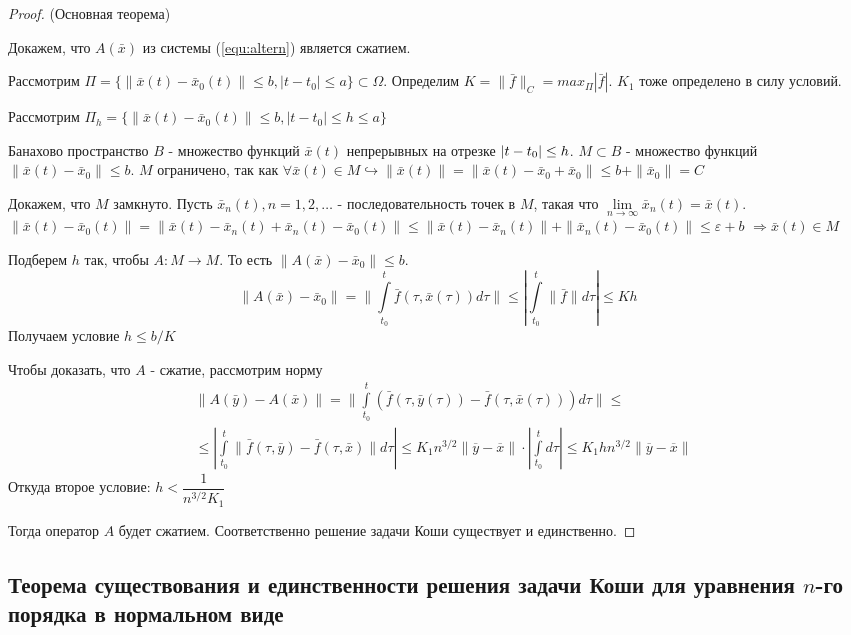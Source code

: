\begin{proof}
	(Основная теорема)
	
	Докажем, что $A(\bar{x})$ из системы (\ref{equ:altern}) является сжатием.
	
	Рассмотрим $\Pi = \{\|\bar{x}(t) - \bar{x}_0(t)\| \le b, |t-t_0| \le a   \} \subset \Omega$. Определим $K = \|\bar{f}\|_C = max_{\Pi}|\bar{f}|$. $K_1$ тоже определено в силу условий.
	
	Рассмотрим $\Pi_h = \{\|\bar{x}(t) - \bar{x}_0(t)\| \le b, |t-t_0| \le h \le a   \}$
	
	Банахово пространство $B$ - множество функций $\bar{x}(t)$ непрерывных на отрезке $|t-t_0|\hm\le h$. $M \subset B$ - множество функций $\|\bar{x}(t) - \bar{x}_0\| \le b$. $M$ ограничено, так как $\forall \bar{x}(t) \in M \hookrightarrow \|\bar{x}(t)\| = \|\bar{x}(t) - \bar{x}_0 + \bar{x}_0\| \le b + \|\bar{x}_0\| = C$
	
	Докажем, что $M$ замкнуто. Пусть $\bar{x}_n(t), n = 1, 2, \dots$ - последовательность точек в $M$, такая что $\lim\limits_{n\to \infty} \bar{x}_n(t) = \bar{x}(t)$. $\|\bar{x}(t) - \bar{x}_0(t)\| = \|\bar{x}(t) - \bar{x}_n(t) + \bar{x}_n(t) - \bar{x}_0(t)\| \le \|\bar{x}(t) - \bar{x}_n(t)\| + \|\bar{x}_n(t) - \bar{x}_0(t)\| \le \varepsilon + b$ $\Rightarrow \bar{x}(t) \in M$
	
	Подберем $h$ так, чтобы $A:M\to M$. То есть $\|A(\bar{x}) - \bar{x}_0\| \le b$.
	\[
		\|A(\bar{x}) - \bar{x}_0\| = \|\int\limits_{t_0}^t \bar{f}(\tau, \bar{x}(\tau))d\tau\| \le |\int\limits_{t_0}^t \|\bar{f}\|d\tau| \le Kh
	\]
	Получаем условие $h\le b/K$
	
	Чтобы доказать, что $A$ - сжатие, рассмотрим норму
	\begin{align*}
		&\|A(\bar{y}) - A(\bar{x})\| = \|\int\limits_{t_0}^t(\bar{f}(\tau, \bar{y}(\tau)) - \bar{f}(\tau, \bar{x}(\tau)))d\tau\|\le \\ &\le |\int\limits_{t_0}^t \|\bar{f}(\tau, \bar{y}) - \bar{f}(\tau, \bar{x})\|d\tau| \le K_1n^{3/2}\|\overline{y} - \overline{x}\|\cdot|\int\limits_{t_0}^td\tau| \le K_1hn^{3/2}\|\overline{y} - \overline{x}\|
	\end{align*}
	Откуда второе условие: $h < \dfrac{1}{n^{3/2}K_1}$
	
	Тогда оператор $A$ будет сжатием. Соответственно решение задачи Коши существует и единственно.
	
\end{proof}

\subsection{Теорема существования и единственности решения задачи Коши для уравнения $n$-го порядка в нормальном виде}


